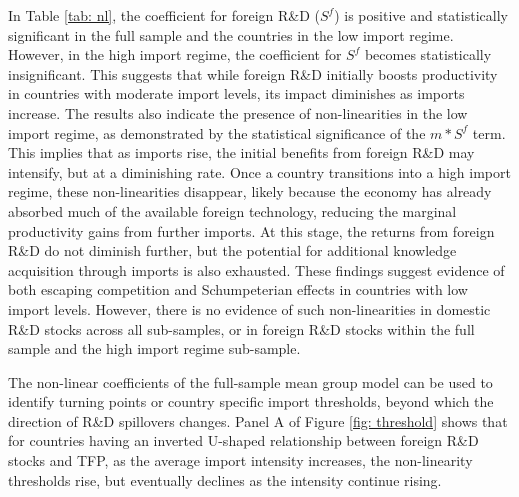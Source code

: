 \documentclass[12pt]{article}
\begin{document}
In Table \ref{tab: nl}, the coefficient for foreign R\&D ($S^f$) is positive and statistically significant in the full sample and the countries in the low import regime. However, in the high import regime, the coefficient for $S^f$ becomes statistically insignificant. This suggests that while foreign R\&D initially boosts productivity in countries with moderate import levels, its impact diminishes as imports increase. The results also indicate the presence of non-linearities in the low import regime, as demonstrated by the statistical significance of the $m*S^f$ term. This implies that as imports rise, the initial benefits from foreign R\&D may intensify, but at a diminishing rate. Once a country transitions into a high import regime, these non-linearities disappear, likely because the economy has already absorbed much of the available foreign technology, reducing the marginal productivity gains from further imports. At this stage, the returns from foreign R\&D do not diminish further, but the potential for additional knowledge acquisition through imports is also exhausted. These findings suggest evidence of both escaping competition and Schumpeterian effects in countries with low import levels. However, there is no evidence of such non-linearities in domestic R\&D stocks across all sub-samples, or in foreign R\&D stocks within the full sample and the high import regime sub-sample.

The non-linear coefficients of the full-sample mean group model can be used to identify turning points or country specific import thresholds, beyond which the direction of R\&D spillovers changes. Panel A of Figure \ref{fig: threshold} shows that for countries having an inverted U-shaped relationship between foreign R\&D stocks and TFP, as the average import intensity increases, the non-linearity thresholds rise, but eventually declines as the intensity continue rising. 
\end{document}
